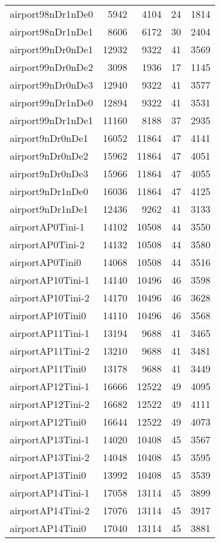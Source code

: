 \begin{tabular}{lrrrr}
airport98nDr1nDe0 & 5942 & 4104 & 24 & 1814 \\
airport98nDr1nDe1 & 8606 & 6172 & 30 & 2404 \\
airport99nDr0nDe1 & 12932 & 9322 & 41 & 3569 \\
airport99nDr0nDe2 & 3098 & 1936 & 17 & 1145 \\
airport99nDr0nDe3 & 12940 & 9322 & 41 & 3577 \\
airport99nDr1nDe0 & 12894 & 9322 & 41 & 3531 \\
airport99nDr1nDe1 & 11160 & 8188 & 37 & 2935 \\
airport9nDr0nDe1 & 16052 & 11864 & 47 & 4141 \\
airport9nDr0nDe2 & 15962 & 11864 & 47 & 4051 \\
airport9nDr0nDe3 & 15966 & 11864 & 47 & 4055 \\
airport9nDr1nDe0 & 16036 & 11864 & 47 & 4125 \\
airport9nDr1nDe1 & 12436 & 9262 & 41 & 3133 \\
airportAP0Tini-1 & 14102 & 10508 & 44 & 3550 \\
airportAP0Tini-2 & 14132 & 10508 & 44 & 3580 \\
airportAP0Tini0 & 14068 & 10508 & 44 & 3516 \\
airportAP10Tini-1 & 14140 & 10496 & 46 & 3598 \\
airportAP10Tini-2 & 14170 & 10496 & 46 & 3628 \\
airportAP10Tini0 & 14110 & 10496 & 46 & 3568 \\
airportAP11Tini-1 & 13194 & 9688 & 41 & 3465 \\
airportAP11Tini-2 & 13210 & 9688 & 41 & 3481 \\
airportAP11Tini0 & 13178 & 9688 & 41 & 3449 \\
airportAP12Tini-1 & 16666 & 12522 & 49 & 4095 \\
airportAP12Tini-2 & 16682 & 12522 & 49 & 4111 \\
airportAP12Tini0 & 16644 & 12522 & 49 & 4073 \\
airportAP13Tini-1 & 14020 & 10408 & 45 & 3567 \\
airportAP13Tini-2 & 14048 & 10408 & 45 & 3595 \\
airportAP13Tini0 & 13992 & 10408 & 45 & 3539 \\
airportAP14Tini-1 & 17058 & 13114 & 45 & 3899 \\
airportAP14Tini-2 & 17076 & 13114 & 45 & 3917 \\
airportAP14Tini0 & 17040 & 13114 & 45 & 3881 \\

\end{tabular}
